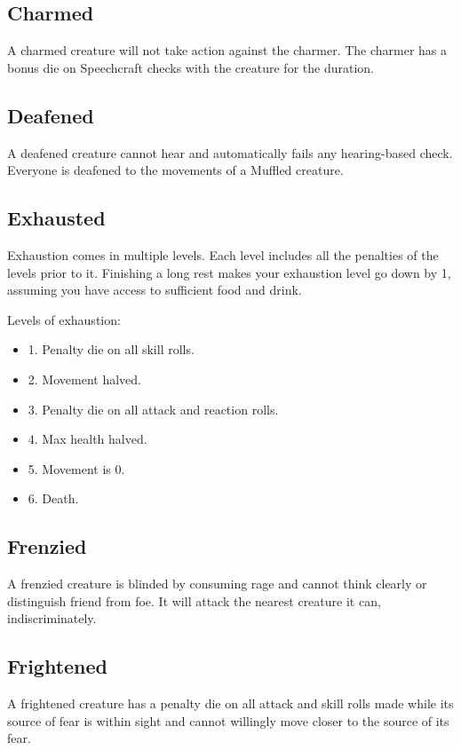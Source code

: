 \subsection{Charmed}
A charmed creature will not take action against the charmer. The charmer has a bonus die on Speechcraft checks with the creature for the duration.

\subsection{Deafened}
A deafened creature cannot hear and automatically fails any hearing-based check. Everyone is deafened to the movements of a Muffled creature.

\subsection{Exhausted}
Exhaustion comes in multiple levels. Each level includes all the penalties of the levels prior to it. Finishing a long rest makes your exhaustion level go down by 1, assuming you have access to sufficient food and drink.

Levels of exhaustion:

\begin{itemize}
	\item 1. Penalty die on all skill rolls.
	\item 2. Movement halved.
	\item 3. Penalty die on all attack and reaction rolls.
	\item 4. Max health halved.
	\item 5. Movement is 0.
	\item 6. Death.
\end{itemize}

\subsection{Frenzied}
A frenzied creature is blinded by consuming rage and cannot think clearly or distinguish friend from foe. It will attack the nearest creature it can, indiscriminately.

\subsection{Frightened}
A frightened creature has a penalty die on all attack and skill rolls made while its source of fear is within sight and cannot willingly move closer to the source of its fear.

